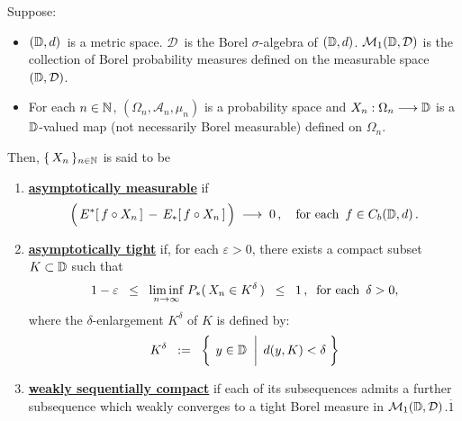 \begin{definition}
\mbox{}\vskip 0.1cm
\noindent
Suppose:
\begin{itemize}
\item
	$(\mathbb{D},d)$\, is a metric space.
	$\mathcal{D}$\, is the Borel $\sigma$-algebra of $(\mathbb{D},d)$.
	\vskip 0.0cm
	$\mathcal{M}_{1}(\mathbb{D},\mathcal{D})$ is the collection of Borel probability measures
	defined on the measurable space $(\mathbb{D},\mathcal{D})$.
\item
	For each $n \in \mathbb{N}$,
	$(\Omega_{n},\mathcal{A}_{n},\mu_{n})$ is a probability space and
	$X_{n} : \Omega_{n} \longrightarrow \mathbb{D}$
	is a $\mathbb{D}$-valued map (not necessarily Borel measurable) defined on $\Omega_{n}$.
\end{itemize}
Then, $\{\,X_{n}\,\}_{n\in\mathbb{N}}$ is said to be
\begin{enumerate}
\item
	\underline{\textbf{asymptotically measurable}}\; if
	\begin{equation*}
	\left(\, \overset{{\color{white}.}}{E^{*}}\!\left[\,f \circ X_{n}\,\right] \,-\, E_{*}\!\left[\,f \circ X_{n}\,\right] \,\right)
	\;\longrightarrow\;
	0\,,
	\quad
	\textnormal{for each \,$f \in C_{b}(\D,d)$}\,.
	\end{equation*}
\item
	\underline{\textbf{asymptotically tight}}\; if, for each $\varepsilon > 0$, there exists
	a compact subset $K \subset \mathbb{D}$ such that
	\begin{equation*}
	1 - \varepsilon
	\;\; \leq \;\; \underset{n\rightarrow\infty}{\liminf}\; P_{*}(\,X_{n} \in K^{\delta}\,)
	\;\; \leq \;\; 1\,,
	\;\;
	\textnormal{for each \,$\delta > 0$},
	\end{equation*}
	where the $\delta$-enlargement $K^{\delta}$ of $K$ is defined by:
	\begin{equation*}
	K^{\delta}
		\;\; := \;\;
		\left\{\;
		\left.
		y \overset{{\color{white}-}}{\in} \D
		\;\;\right\vert\;
		d(y,K) < \delta
		\;\right\}
	\end{equation*}
\item
	\underline{\textbf{weakly sequentially compact}}\; if each of its subsequences
	admits a further subsequence which weakly converges to a tight
	Borel measure in $\mathcal{M}_{1}(\mathbb{D},\mathcal{D})$.{\color{white}$\overset{.}{1}$}
\end{enumerate}
\end{definition}


